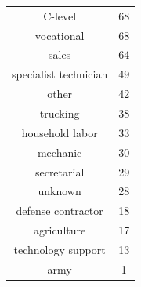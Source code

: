 \begin{table}[!h]
    \vspace{5mm}

    \begin{subtable}[ht]{.5\textwidth}
        \centering
        \begin{tabular}{cc}
            C-level & 68 \\
            vocational & 68 \\
            sales & 64 \\
            specialist technician & 49 \\
            other & 42 \\
            trucking & 38 \\
            household labor & 33 \\
            mechanic & 30 \\
            secretarial & 29 \\
            unknown & 28 \\
            defense contractor & 18 \\
            agriculture & 17 \\
            technology support & 13 \\
            army & 1 \\
        \end{tabular}
    \end{subtable}
\end{table}


